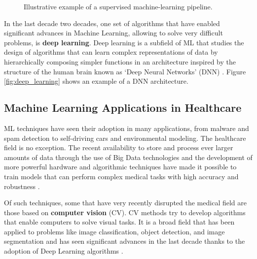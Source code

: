 \documentclass[../main.tex]{subfiles}
\begin{document}
    \begin{figure}
        \centering
        \resizebox*{1\columnwidth}{!}{
            
        }
        \caption{Illustrative example of a supervised machine-learning pipeline.}
        \label{fig:supervised_learning}
    \end{figure}
    
    In the last decade two decades, one set of algorithms that have enabled significant advances in Machine Learning, allowing to solve very difficult problems, is \textbf{deep learning}. Deep learning is a subfield of ML that studies the design of algorithms that can learn complex representations of data by hierarchically composing simpler functions in an architecture inspired by the structure of the human brain known as `Deep Neural Networks' (DNN)  \cite{lecun_deep_2015}. Figure \ref{fig:deep_learning} shows an example of a DNN architecture.
    
    \clearpage
    \subsection{Machine Learning Applications in Healthcare}

    ML techniques have seen their adoption in many applications, from malware and spam detection to self-driving cars and environmental modeling. The healthcare field is no exception. The recent availability to store and process ever larger amounts of data through the use of Big Data technologies and the development of more powerful hardware and algorithmic techniques have made it possible to train models that can perform complex medical tasks with high accuracy and robustness \cite{topol_high-performance_2019}.

    Of such techniques, some that have very recently disrupted the medical field are those based on \textbf{computer vision}  (CV). CV methods try to develop algorithms that enable computers to solve visual tasks. It is a broad field that has been applied to problems like image classification, object detection, and image segmentation and has seen significant advances in the last decade thanks to the adoption of Deep Learning algorithms \cite{lecun_deep_2015}.
\end{document}
